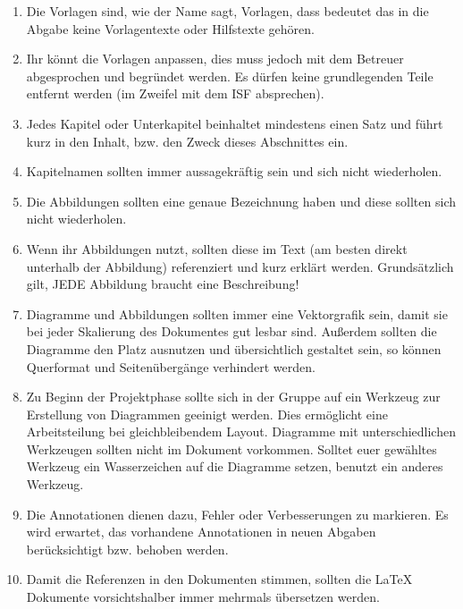 \begin{enumerate}

\item Die Vorlagen sind, wie der Name sagt, Vorlagen, dass bedeutet das in die Abgabe keine Vorlagentexte oder Hilfstexte gehören.

\item Ihr könnt die Vorlagen anpassen, dies muss jedoch mit dem Betreuer abgesprochen und begründet werden. Es dürfen keine grundlegenden Teile entfernt werden (im Zweifel mit dem ISF absprechen).

\item Jedes Kapitel oder Unterkapitel beinhaltet mindestens einen Satz und führt kurz in den Inhalt, bzw. den Zweck dieses Abschnittes ein.

\item Kapitelnamen sollten immer aussagekräftig sein und sich nicht wiederholen.

\item Die Abbildungen sollten eine genaue Bezeichnung haben und diese sollten sich nicht wiederholen.

\item Wenn ihr Abbildungen nutzt, sollten diese im Text (am besten direkt unterhalb der Abbildung) referenziert und kurz erklärt werden. Grundsätzlich gilt, JEDE Abbildung braucht eine Beschreibung!

\item Diagramme und Abbildungen sollten immer eine Vektorgrafik sein, damit sie bei jeder Skalierung des Dokumentes gut lesbar sind. Außerdem sollten die Diagramme den Platz ausnutzen und übersichtlich gestaltet sein, so können Querformat und Seitenübergänge verhindert werden.

\item Zu Beginn der Projektphase sollte sich in der Gruppe auf ein Werkzeug zur Erstellung von Diagrammen geeinigt werden. Dies ermöglicht eine Arbeitsteilung bei gleichbleibendem Layout. Diagramme mit unterschiedlichen Werkzeugen sollten nicht im Dokument vorkommen. Solltet euer gewähltes Werkzeug ein Wasserzeichen auf die Diagramme setzen, benutzt ein anderes Werkzeug.

\item Die Annotationen dienen dazu, Fehler oder Verbesserungen zu markieren. Es wird erwartet, das vorhandene Annotationen in neuen Abgaben berücksichtigt bzw. behoben werden.

\item Damit die Referenzen in den Dokumenten stimmen, sollten die LaTeX Dokumente vorsichtshalber immer mehrmals übersetzen werden.


\end{enumerate}
